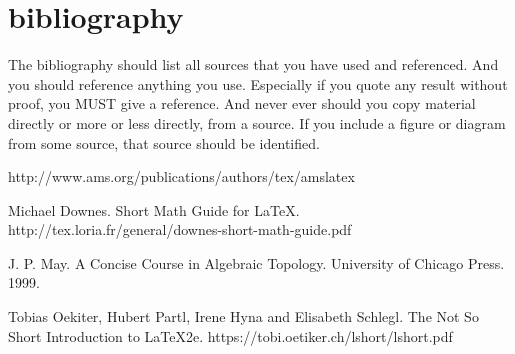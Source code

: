 \documentclass[openany, amssymb, psamsfonts]{amsart}
\theoremstyle{definition}
\numberwithin{equation}{section}
\begin{document}
\section{bibliography}  The bibliography should list all sources that you have used and referenced.
And you should reference anything you use.   Especially if you quote any result without proof, you MUST
give a reference.   And never ever should you copy material directly or more or less directly, from a source.
If you include a figure or diagram from some source, that source should be identified.

\begin{thebibliography}{9}

 http://www.ams.org/publications/authors/tex/amslatex

Michael Downes.
Short Math Guide for \LaTeX.
http://tex.loria.fr/general/downes-short-math-guide.pdf

J. P. May.
A Concise Course in Algebraic Topology.
University of Chicago Press. 1999. 

Tobias Oekiter, Hubert Partl, Irene Hyna and Elisabeth Schlegl.
The Not So Short Introduction to \LaTeX 2e.
https://tobi.oetiker.ch/lshort/lshort.pdf

\end{thebibliography}
\end{document}
